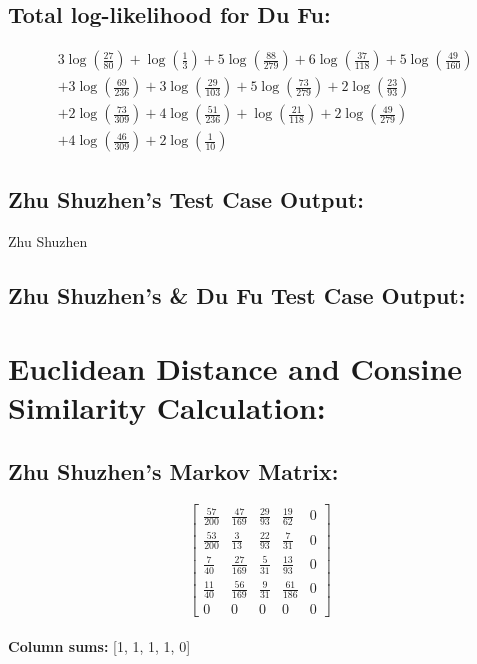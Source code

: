 \documentclass[12pt]{article}
\begin{document}
\subsection*{Total log-likelihood for Du Fu:}
\[
\begin{aligned}
    &3\log\left(\frac{27}{80}\right) + \log\left(\frac{1}{3}\right) + 5\log\left(\frac{88}{279}\right) + 6\log\left(\frac{37}{118}\right) + 5\log\left(\frac{49}{160}\right) \\
    &+ 3\log\left(\frac{69}{236}\right) + 3\log\left(\frac{29}{103}\right) + 5\log\left(\frac{73}{279}\right) + 2\log\left(\frac{23}{93}\right) \\
    &+ 2\log\left(\frac{73}{309}\right) + 4\log\left(\frac{51}{236}\right) + \log\left(\frac{21}{118}\right) + 2\log\left(\frac{49}{279}\right) \\
    &+ 4\log\left(\frac{46}{309}\right) + 2\log\left(\frac{1}{10}\right)
\end{aligned}
\]

\subsection*{Zhu Shuzhen's Test Case Output: }
Zhu Shuzhen

\subsection*{Zhu Shuzhen's \& Du Fu Test Case Output: }


\section*{Euclidean Distance and Consine Similarity Calculation: }

\subsection*{Zhu Shuzhen's Markov Matrix:}
\[
\begin{bmatrix}
    \frac{57}{200} & \frac{47}{169} & \frac{29}{93} & \frac{19}{62} & 0 \\
    \frac{53}{200} & \frac{3}{13} & \frac{22}{93} & \frac{7}{31} & 0 \\
    \frac{7}{40} & \frac{27}{169} & \frac{5}{31} & \frac{13}{93} & 0 \\
    \frac{11}{40} & \frac{56}{169} & \frac{9}{31} & \frac{61}{186} & 0 \\
    0 & 0 & 0 & 0 & 0
\end{bmatrix}
\]
\\
\textbf{Column sums:} [1, 1, 1, 1, 0]
\end{document}
